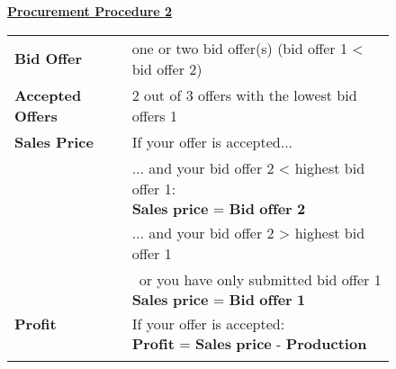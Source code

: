 \documentclass[11pt]{scrartcl}
\begin{document}
{\begin{figure}[ht!]
\begin{minipage}[t]{1\linewidth}
\begin{tcolorbox}[arc=0pt,colframe=black!25]
			\textbf{\underline{Procurement Procedure 2}} ~\bigskip

				\begin{tabular}{ll}
					\textbf{Bid Offer} 				& one or two bid offer(s) (bid offer 1 < bid offer 2) \\
					\textbf{Accepted Offers} 		& 2 out of 3 offers with the lowest bid offers 1 \\
					\textbf{Sales Price} 			& If your offer is accepted... \\ 
													& ... and your bid offer 2 < highest bid offer 1: \\
													& \hspace{0.8cm} $\textbf{Sales price = Bid offer 2}$ \\ 
													& ... and your bid offer 2 > highest bid offer 1 \\
													& ~\quad or you have only submitted bid offer 1 \\
													& \hspace{0.8cm} $\textbf{Sales price = Bid offer 1}$ \\ 
					\textbf{Profit}					& If your offer is accepted: \\ 
													& \hspace{0.8cm} $\textbf{Profit = Sales price - Production cost}$ \\
					\hspace{3.75cm}					& 	   \\
				\end{tabular} ~\bigskip
  
		\end{tcolorbox} 
	\end{minipage}  
  \end{figure}
 \clearpage
 \restoregeometry
}

~\newpage


\end{document}
